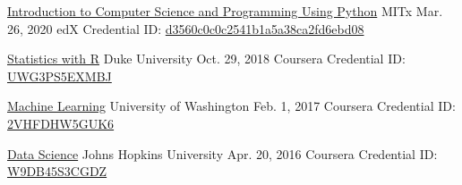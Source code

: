 
\begin{cventries}

\cventry
    {\href{https://courses.edx.org/certificates/d3560c0c0c2541b1a5a38ca2fd6ebd08}{Introduction to Computer Science and Programming Using Python}} %
    {MITx} %
    {Mar. 26, 2020} %
    {edX} %
    {
      Credential ID: \href{https://courses.edx.org/certificates/d3560c0c0c2541b1a5a38ca2fd6ebd08}{d3560c0c0c2541b1a5a38ca2fd6ebd08}
    }

\cventry
    {\href{https://www.coursera.org/account/accomplishments/specialization/2VHFDHW5GUK6}{Statistics with R}} %
    {Duke University} %
    {Oct. 29, 2018} %
    {Coursera} %
    {
      Credential ID: \href{https://www.coursera.org/account/accomplishments/specialization/UWG3PS5EXMBJ}{UWG3PS5EXMBJ}
    }

\cventry
    {\href{https://www.coursera.org/account/accomplishments/specialization/2VHFDHW5GUK6}{Machine Learning}} %
    {University of Washington} %
    {Feb. 1, 2017} %
    {Coursera} %
    {
      Credential ID: \href{https://www.coursera.org/account/accomplishments/specialization/2VHFDHW5GUK6}{2VHFDHW5GUK6}
    }

\cventry
    {\href{https://www.coursera.org/account/accomplishments/specialization/W9DB45S3CGDZ}{Data Science}} %
    {Johns Hopkins University} %
    {Apr. 20, 2016} %
    {Coursera} %
    {
      Credential ID: \href{https://www.coursera.org/account/accomplishments/specialization/W9DB45S3CGDZ}{W9DB45S3CGDZ}
    }

\end{cventries}